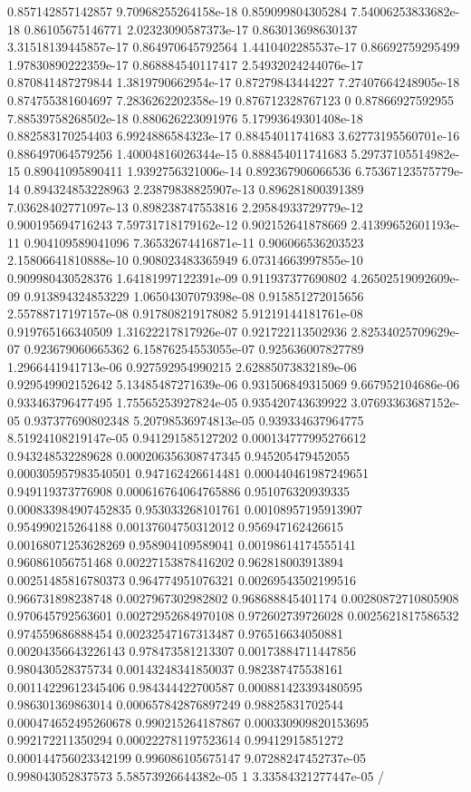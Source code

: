 \begin{table}
\begin{tabu}
\begin{sparkline}{10}
0.857142857142857 9.70968255264158e-18 0.859099804305284 7.54006253833682e-18 0.86105675146771 2.02323090587373e-17 0.863013698630137 3.31518139445857e-17 0.864970645792564 1.4410402285537e-17 0.86692759295499 1.97830890222359e-17 0.868884540117417 2.54932024244076e-17 0.870841487279844 1.3819790662954e-17 0.87279843444227 7.27407664248905e-18 0.874755381604697 7.2836262202358e-19 0.876712328767123 0 0.87866927592955 7.88539758268502e-18 0.880626223091976 5.17993649301408e-18 0.882583170254403 6.9924886584323e-17 0.88454011741683 3.62773195560701e-16 0.886497064579256 1.40004816026344e-15 0.888454011741683 5.29737105514982e-15 0.89041095890411 1.9392756321006e-14 0.892367906066536 6.75367123575779e-14 0.894324853228963 2.23879838825907e-13 0.896281800391389 7.03628402771097e-13 0.898238747553816 2.29584933729779e-12 0.900195694716243 7.59731718179162e-12 0.902152641878669 2.41399652601193e-11 0.904109589041096 7.36532674416871e-11 0.906066536203523 2.15806641810888e-10 0.908023483365949 6.07314663997855e-10 0.909980430528376 1.64181997122391e-09 0.911937377690802 4.26502519092609e-09 0.913894324853229 1.06504307079398e-08 0.915851272015656 2.55788717197157e-08 0.917808219178082 5.91219144181761e-08 0.919765166340509 1.31622217817926e-07 0.921722113502936 2.82534025709629e-07 0.923679060665362 6.15876254553055e-07 0.925636007827789 1.2966441941713e-06 0.927592954990215 2.62885073832189e-06 0.929549902152642 5.13485487271639e-06 0.931506849315069 9.667952104686e-06 0.933463796477495 1.75565253927824e-05 0.935420743639922 3.07693363687152e-05 0.937377690802348 5.20798536974813e-05 0.939334637964775 8.51924108219147e-05 0.941291585127202 0.000134777995276612 0.943248532289628 0.000206356308747345 0.945205479452055 0.000305957983540501 0.947162426614481 0.000440461987249651 0.949119373776908 0.000616764064765886 0.951076320939335 0.000833984907452835 0.953033268101761 0.00108957195913907 0.954990215264188 0.00137604750312012 0.956947162426615 0.00168071253628269 0.958904109589041 0.00198614174555141 0.960861056751468 0.00227153878416202 0.962818003913894 0.00251485816780373 0.964774951076321 0.00269543502199516 0.966731898238748 0.0027967302982802 0.968688845401174 0.00280872710805908 0.970645792563601 0.00272952684970108 0.972602739726028 0.0025621817586532 0.974559686888454 0.00232547167313487 0.976516634050881 0.00204356643226143 0.978473581213307 0.00173884711447856 0.980430528375734 0.00143248341850037 0.982387475538161 0.00114229612345406 0.984344422700587 0.000881423393480595 0.986301369863014 0.000657842876897249 0.98825831702544 0.000474652495260678 0.990215264187867 0.000330909820153695 0.992172211350294 0.000222781197523614 0.99412915851272 0.000144756023342199 0.996086105675147 9.07288247452737e-05 0.998043052837573 5.58573926644382e-05 1 3.33584321277447e-05 /

\end{sparkline}
\end{tabu}
\end{table}
